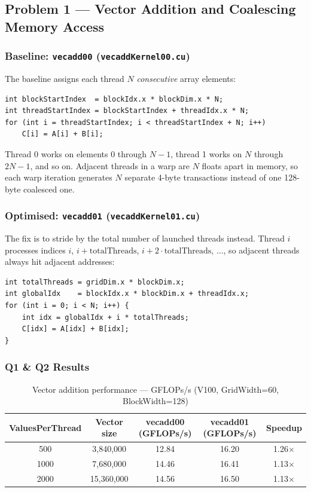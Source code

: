 \documentclass[11pt,letterpaper]{article}
\begin{document}
\subsection{Problem 1 --- Vector Addition and Coalescing Memory Access}

\subsubsection{Baseline: \texttt{vecadd00} (\texttt{vecaddKernel00.cu})}

The baseline assigns each thread $N$ \emph{consecutive} array elements:

\begin{lstlisting}[caption={Non-coalescing kernel (vecaddKernel00.cu)}]
int blockStartIndex  = blockIdx.x * blockDim.x * N;
int threadStartIndex = blockStartIndex + threadIdx.x * N;
for (int i = threadStartIndex; i < threadStartIndex + N; i++)
    C[i] = A[i] + B[i];
\end{lstlisting}

Thread 0 works on elements 0 through $N-1$, thread 1 works on $N$ through $2N-1$,
and so on. Adjacent threads in a warp are $N$ floats apart in memory, so each warp
iteration generates $N$ separate 4-byte transactions instead of one 128-byte
coalesced one.

\subsubsection{Optimised: \texttt{vecadd01} (\texttt{vecaddKernel01.cu})}

The fix is to stride by the total number of launched threads instead. Thread $i$
processes indices $i$, $i + \text{totalThreads}$, $i + 2 \cdot \text{totalThreads}$, ...,
so adjacent threads always hit adjacent addresses:

\begin{lstlisting}[caption={Coalescing kernel (vecaddKernel01.cu)}]
int totalThreads = gridDim.x * blockDim.x;
int globalIdx    = blockIdx.x * blockDim.x + threadIdx.x;
for (int i = 0; i < N; i++) {
    int idx = globalIdx + i * totalThreads;
    C[idx] = A[idx] + B[idx];
}
\end{lstlisting}

\subsubsection{Q1 \& Q2 Results}

\begin{table}[H]
\centering
\caption{Vector addition performance --- GFLOPs/s (V100, GridWidth=60, BlockWidth=128)}
\begin{tabular}{ccccc}
\toprule
\textbf{ValuesPerThread} & \textbf{Vector size} &
\textbf{vecadd00 (GFLOPs/s)} & \textbf{vecadd01 (GFLOPs/s)} & \textbf{Speedup} \\
\midrule
500  & 3,840,000  & 12.84 & 16.20 & 1.26$\times$ \\
1000 & 7,680,000  & 14.46 & 16.41 & 1.13$\times$ \\
2000 & 15,360,000 & 14.56 & 16.50 & 1.13$\times$ \\
\bottomrule
\end{tabular}
\end{table}
\end{document}
